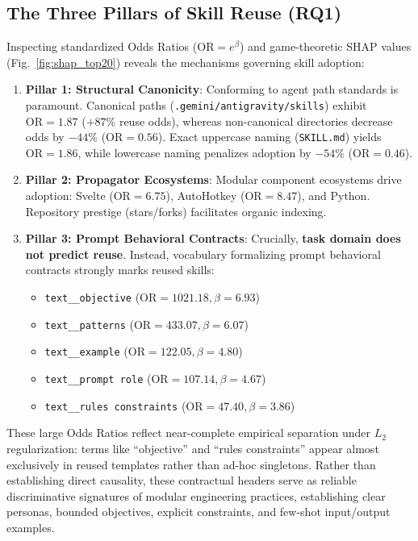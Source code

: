 \documentclass[10pt,conference]{IEEEtran}
\begin{document}
\subsection{The Three Pillars of Skill Reuse (RQ1)}
Inspecting standardized Odds Ratios ($\text{OR} = e^\beta$) and game-theoretic SHAP values \cite{lundberg2017unified,molnar2020interpretable} (Fig.~\ref{fig:shap_top20}) reveals the mechanisms governing skill adoption:
\begin{enumerate}
    \item \textbf{Pillar 1: Structural Canonicity}: Conforming to agent path standards is paramount. Canonical paths (\texttt{.gemini/antigravity/skills}) exhibit $\text{OR} = 1.87$ ($+87\%$ reuse odds), whereas non-canonical directories decrease odds by $-44\%$ ($\text{OR} = 0.56$). Exact uppercase naming (\texttt{SKILL.md}) yields $\text{OR} = 1.86$, while lowercase naming penalizes adoption by $-54\%$ ($\text{OR} = 0.46$).
    \item \textbf{Pillar 2: Propagator Ecosystems}: Modular component ecosystems drive adoption: Svelte ($\text{OR} = 6.75$), AutoHotkey ($\text{OR} = 8.47$), and Python. Repository prestige (stars/forks) facilitates organic indexing.
    \item \textbf{Pillar 3: Prompt Behavioral Contracts}: Crucially, \textbf{task domain does not predict reuse}. Instead, vocabulary formalizing prompt behavioral contracts strongly marks reused skills:
    \begin{itemize}
        \item \texttt{text\_\_objective} ($\text{OR} = 1021.18, \beta = 6.93$)
        \item \texttt{text\_\_patterns} ($\text{OR} = 433.07, \beta = 6.07$)
        \item \texttt{text\_\_example} ($\text{OR} = 122.05, \beta = 4.80$)
        \item \texttt{text\_\_prompt role} ($\text{OR} = 107.14, \beta = 4.67$)
        \item \texttt{text\_\_rules constraints} ($\text{OR} = 47.40, \beta = 3.86$)
    \end{itemize}
\end{enumerate}
These large Odds Ratios reflect near-complete empirical separation under $L_2$ regularization: terms like ``objective'' and ``rules constraints'' appear almost exclusively in reused templates rather than ad-hoc singletons. Rather than establishing direct causality, these contractual headers serve as reliable discriminative signatures of modular engineering practices, establishing clear personas, bounded objectives, explicit constraints, and few-shot input/output examples.
\end{document}
